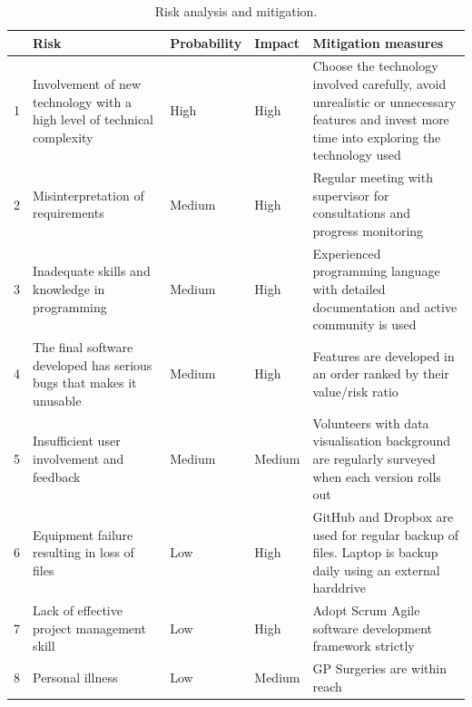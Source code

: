\documentclass[11pt,a4paper]{article}
\begin{document}
\begin{table}
	\centering
	\label{tab:4}
	\begin{tabularx}{\textwidth}{p{0.2cm} X|>{\raggedleft\arraybackslash}p{2cm}|>{\raggedleft\arraybackslash}p{1.2cm}|X}
		\hline\hline
		  & \textbf{Risk}                                                           & \textbf{Probability} & \textbf{Impact} & \textbf{Mitigation measures}                                                                                                                \\\hline
		1 & Involvement of new technology with a high level of technical complexity & High                 & High            & Choose the technology involved carefully, avoid unrealistic or unnecessary features and invest more time into exploring the technology	used \\\hline
		2 & Misinterpretation of requirements                                       & Medium               & High            & Regular meeting with supervisor for consultations and progress monitoring                                                                   \\\hline
		3 & Inadequate skills and knowledge in programming                          & Medium               & High            & Experienced programming language with detailed documentation and active community is used                                                   \\\hline
		4 & The final software developed has serious bugs that makes it unusable    & Medium               & High            & Features are developed in an order ranked by their value/risk ratio                                                                         \\\hline
		5 & Insufficient user involvement and feedback                              & Medium               & Medium          & Volunteers with data visualisation background are regularly surveyed when each version rolls out                                            \\\hline
		6 & Equipment failure resulting in loss of files                            & Low                  & High            & GitHub and Dropbox are used for regular backup of files. Laptop is backup daily using an external harddrive                                 \\\hline
		7 & Lack of effective project management skill                              & Low                  & High            & Adopt Scrum Agile software development framework strictly                                                                                   \\\hline
		8 & Personal illness                                                        & Low                  & Medium          & GP Surgeries are within reach                                                                                                               \\\hline
		\hline
	\end{tabularx}	
	\caption{Risk analysis and mitigation.}
\end{table}
\end{document}

